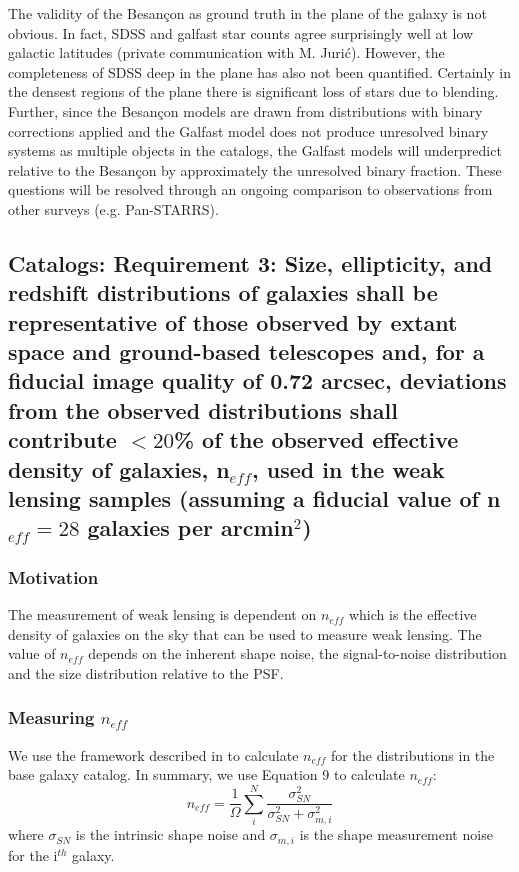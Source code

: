 \documentclass[]{article}
\begin{document}
{The validity of the Besan\c{c}on as ground truth in the plane of the galaxy is not obvious.  In fact, SDSS and galfast star counts agree surprisingly well at low galactic latitudes (private communication with M. Juri\'{c}). 
However, the completeness of SDSS deep in the plane has also not been quantified.  Certainly in the densest regions
of the plane there is significant loss of stars due to blending.  Further, since the Besan\c{c}on models are drawn
from distributions with binary corrections applied and the Galfast model does not produce unresolved binary systems
as multiple objects in the catalogs, the Galfast models will underpredict relative to the Besan\c{c}on by 
approximately the unresolved binary fraction.  These questions will be resolved through an ongoing comparison to observations
from other surveys (e.g. Pan-STARRS).

\subsection{Catalogs:  Requirement 3: Size, ellipticity, and redshift
  distributions of galaxies shall be representative of those observed
  by extant space and ground-based telescopes and, for a fiducial
  image quality of 0.72 arcsec, deviations from the observed
  distributions shall contribute $<20$\% of the observed effective
  density of galaxies, n$_{eff}$, used in the weak lensing samples
  (assuming a fiducial value of n$_{eff} = 28$ galaxies per
  arcmin$^2$)}
\subsubsection{Motivation}
The measurement of weak lensing is dependent 
on $n_{eff}$ which is the effective density of galaxies on the sky that can be used to measure weak lensing.  
The value of $n_{eff}$ depends on the inherent shape noise, the signal-to-noise distribution and the size distribution relative to the PSF.



\subsubsection{Measuring $n_{eff}$}
We use the framework described in \citet{chang} to calculate $n_{eff}$ for the distributions in the 
base galaxy catalog.  In summary, we use Equation 9 to calculate $n_{eff}$:
\begin{equation}
n_{eff} = \frac{1}{\Omega}\sum^N_i\frac{\sigma^2_{SN}}{\sigma^2_{SN}+\sigma^2_{m,i}}
\end{equation}
where $\sigma_{SN}$ is the intrinsic shape noise and $\sigma_{m,i}$ is the shape measurement noise for the i$^{th}$ galaxy.

}
\end{document}
